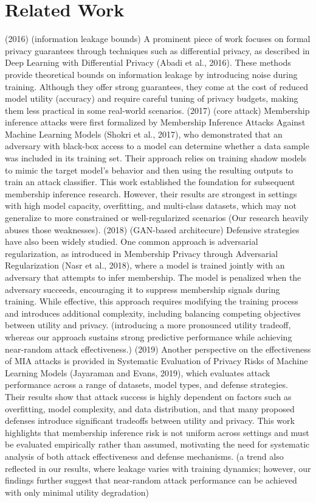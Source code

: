 \documentclass[conference]{IEEEtran}
\begin{document}
\section{Related Work}
(2016) (information leakage bounds)
A prominent piece of work focuses on formal privacy guarantees through techniques such as differential privacy, as described in Deep Learning with Differential Privacy (Abadi et al., 2016). These methods provide theoretical bounds on information leakage by introducing noise during training. Although they offer strong guarantees, they come at the cost of reduced model utility (accuracy) and require careful tuning of privacy budgets, making them less practical in some real-world scenarios.
(2017) (core attack)
Membership inference attacks were first formalized by Membership Inference Attacks Against Machine Learning Models (Shokri et al., 2017), who demonstrated that an adversary with black-box access to a model can determine whether a data sample was included in its training set. Their approach relies on training shadow models to mimic the target model’s behavior and then using the resulting outputs to train an attack classifier. This work established the foundation for subsequent membership inference research. However, their results are strongest in settings with high model capacity, overfitting, and multi-class datasets, which may not generalize to more constrained or well-regularized scenarios (Our research heavily abuses those weaknesses).
(2018) (GAN-based architecure)
Defensive strategies have also been widely studied. One common approach is adversarial regularization, as introduced in Membership Privacy through Adversarial Regularization (Nasr et al., 2018), where a model is trained jointly with an adversary that attempts to infer membership. The model is penalized when the adversary succeeds, encouraging it to suppress membership signals during training. While effective, this approach requires modifying the training process and introduces additional complexity, including balancing competing objectives between utility and privacy. (introducing a more pronounced utility tradeoff, whereas our approach sustains strong predictive performance while achieving near-random attack effectiveness.)
(2019)
Another perspective on the effectiveness of MIA attacks is provided in Systematic Evaluation of Privacy Risks of Machine Learning Models (Jayaraman and Evans, 2019), which evaluates attack performance across a range of datasets, model types, and defense strategies. Their results show that attack success is highly dependent on factors such as overfitting, model complexity, and data distribution, and that many proposed defenses introduce significant tradeoffs between utility and privacy. This work highlights that membership inference risk is not uniform across settings and must be evaluated empirically rather than assumed, motivating the need for systematic analysis of both attack effectiveness and defense mechanisms. (a trend also reflected in our results, where leakage varies with training dynamics; however, our findings further suggest that near-random attack performance can be achieved with only minimal utility degradation)
\end{document}
